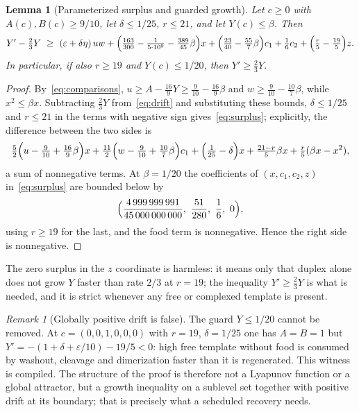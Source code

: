 \documentclass[11pt,a4paper]{article}
\theoremstyle{plain}
\newtheorem{lemma}[theorem]{Lemma}
\theoremstyle{definition}
\theoremstyle{remark}
\newtheorem{remark}[theorem]{Remark}
\newcommand{\eps}{\varepsilon}
\begin{document}
\begin{lemma}[Parameterized surplus and guarded growth]\label{lem:growth}
Let $c\ge0$ with $A(c),B(c)\ge9/10$, let $\delta\le1/25$, $r\le21$, and let $Y(c)\le\beta$. Then
\begin{equation}\label{eq:surplus}
Y'-\tfrac23Y\ \ge\ (\eps+\delta\eta)\,uw+\Bigl(\tfrac{163}{300}-\tfrac1{5\cdot10^9}-\tfrac{389}{45}\beta\Bigr)x+\Bigl(\tfrac{23}{40}-\tfrac{55}{7}\beta\Bigr)c_1+\tfrac16c_2+\Bigl(\tfrac r5-\tfrac{19}5\Bigr)z .
\end{equation}
In particular, if also $r\ge19$ and $Y(c)\le1/20$, then $Y'\ge\tfrac23Y$.
\end{lemma}
\begin{proof}
By~\eqref{eq:comparisons}, $u\ge A-\tfrac{16}9Y\ge\tfrac9{10}-\tfrac{16}9\beta$ and $w\ge\tfrac9{10}-\tfrac{10}7\beta$, while $x^2\le\beta x$. Subtracting $\tfrac23Y$ from~\eqref{eq:drift} and substituting these bounds, $\delta\le1/25$ and $r\le21$ in the terms with negative sign gives~\eqref{eq:surplus}; explicitly, the difference between the two sides is
\[
\tfrac52\Bigl(u-\tfrac9{10}+\tfrac{16}9\beta\Bigr)x+\tfrac{11}2\Bigl(w-\tfrac9{10}+\tfrac{10}7\beta\Bigr)c_1+\Bigl(\tfrac1{25}-\delta\Bigr)x+\tfrac{21-r}5\beta x+\tfrac r5(\beta x-x^2),
\]
a sum of nonnegative terms. At $\beta=1/20$ the coefficients of $(x,c_1,c_2,z)$ in~\eqref{eq:surplus} are bounded below by
\[
\Bigl(\frac{4\,999\,999\,991}{45\,000\,000\,000},\ \frac{51}{280},\ \frac16,\ 0\Bigr),
\]
using $r\ge19$ for the last, and the food term is nonnegative. Hence the right side is nonnegative.
\end{proof}
The zero surplus in the $z$ coordinate is harmless: it means only that duplex alone does not grow $Y$ faster than rate $2/3$ at $r=19$; the inequality $Y'\ge\tfrac23Y$ is what is needed, and it is strict whenever any free or complexed template is present.

\begin{remark}[Globally positive drift is false]\label{rem:falsified}
The guard $Y\le1/20$ cannot be removed. At $c=(0,0,1,0,0,0)$ with $r=19$, $\delta=1/25$ one has $A=B=1$ but $Y'=-(1+\delta+\eps/10)-19/5<0$: high free template without food is consumed by washout, cleavage and dimerization faster than it is regenerated. This witness is compiled. The structure of the proof is therefore not a Lyapunov function or a global attractor, but a growth inequality on a sublevel set together with positive drift at its boundary; that is precisely what a scheduled recovery needs.
\end{remark}
\end{document}
